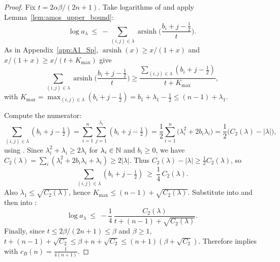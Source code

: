 \begin{proof}
Fix $t=2\alpha\beta/(2n+1)$.
Take logarithms of  and apply Lemma~\ref{lem:amos_upper_bound}:
\begin{equation}
\label{eq:SOodd_log_asinh}
\log a_{\lambda}\ \le\ -\sum_{(i,j)\in\lambda}\operatorname{arsinh}\Big(\frac{b_i+j-\tfrac12}{t}\Big).
\end{equation}
As in Appendix~\ref{app:A1_Sp},
$\operatorname{arsinh}(x)\ge x/(1+x)$ and $x/(1+x)\ge x/(t+K_{\max})$ give
\begin{equation}
\label{eq:SOodd_sum_lower}
\sum_{(i,j)\in\lambda}\operatorname{arsinh}\Big(\frac{b_i+j-\tfrac12}{t}\Big)
\ge \frac{\sum_{(i,j)\in\lambda}(b_i+j-\tfrac12)}{t+K_{\max}},
\end{equation}
with $K_{\max}=\max_{(i,j)\in\lambda}(b_i+j-\tfrac12)=b_1+\lambda_1-\tfrac12\le (n-1)+\lambda_1$.

Compute the numerator:
\begin{equation}
\label{eq:SOodd_box_sum}
\sum_{(i,j)\in\lambda}(b_i+j-\tfrac12)
=\sum_{i=1}^n\sum_{j=1}^{\lambda_i}(b_i+j-\tfrac12)
=\frac12\sum_{i=1}^n\big(\lambda_i^2+2b_i\lambda_i\big)
=\frac12\big(C_2(\lambda)-|\lambda|\big),
\end{equation}
using .
Since $\lambda_i^2+\lambda_i\ge 2\lambda_i$ for $\lambda_i\in\mathbb N$ and $b_i\ge 0$, we have
$C_2(\lambda)=\sum_i(\lambda_i^2+2b_i\lambda_i+\lambda_i)\ge 2|\lambda|$.
Thus $C_2(\lambda)-|\lambda|\ge \tfrac12 C_2(\lambda)$, so
\begin{equation}
\label{eq:SOodd_box_sum_ge_c2}
\sum_{(i,j)\in\lambda}(b_i+j-\tfrac12)\ \ge\ \frac14\,C_2(\lambda).
\end{equation}
Also $\lambda_1\le \sqrt{C_2(\lambda)}$, hence
$K_{\max}\le (n-1)+\sqrt{C_2(\lambda)}$.
Substitute  into  and then into :
\begin{equation}
\label{eq:SOodd_log_final}
\log a_{\lambda}\ \le\ -\frac14\,\frac{C_2(\lambda)}{t+(n-1)+\sqrt{C_2(\lambda)}}.
\end{equation}
Finally, since $t\le 2\beta/(2n+1)\le \beta$ and $\beta\ge 1$,
$t+(n-1)+\sqrt{C_2}\le \beta+n+\sqrt{C_2}\le (n+1)(\beta+\sqrt{C_2})$.
Therefore  implies  with
$c_{B}(n)=\frac{1}{4(n+1)}$.
\end{proof}


